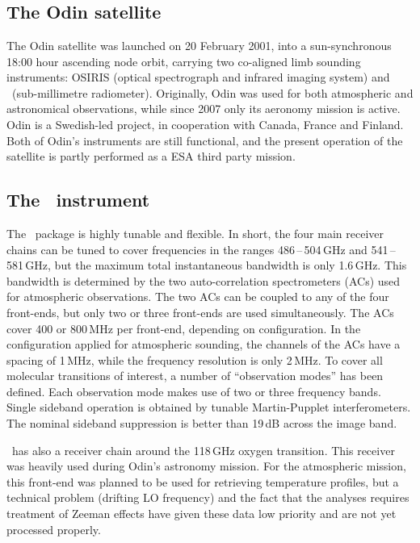 \section{\smr}
\label{sec:odin}
%
\subsection{The Odin satellite}
%
The Odin satellite was launched on 20 February 2001, into a sun-synchronous
18:00 hour ascending node orbit, carrying two co-aligned limb sounding
instruments: OSIRIS (optical spectrograph and infrared imaging system) and
\SMR\ (sub-millimetre radiometer). Originally, Odin was used for both
atmospheric and astronomical observations, while since 2007 only its aeronomy
mission is active. Odin is a Swedish-led project, in cooperation with Canada,
France and Finland. Both of Odin's instruments are still functional, and the
present operation of the satellite is partly performed as a ESA third party
mission.


\subsection{The \SMR\ instrument}
%
The \smr\ package is highly tunable and flexible. In short, the four main
receiver chains can be tuned to cover frequencies in the ranges
486\,--\,504\,GHz and 541\,-- \,581\,GHz, but the maximum total instantaneous
bandwidth is only 1.6\,GHz. This bandwidth is determined by the two
auto-correlation spectrometers (ACs) used for atmospheric observations. The two
ACs can be coupled to any of the four front-ends, but only two or three
front-ends are used simultaneously. The ACs cover 400 or 800\,MHz per
front-end, depending on configuration. In the configuration applied for
atmospheric sounding, the channels of the ACs have a spacing of 1\,MHz, while
the frequency resolution is only 2\,MHz. To cover all molecular transitions of
interest, a number of ``observation modes'' has been defined. Each observation
mode makes use of two or three frequency bands. Single sideband operation is
obtained by tunable Martin-Pupplet interferometers. The nominal sideband
suppression is better than 19\,dB across the image band.

\smr\ has also a receiver chain around the 118\,GHz oxygen transition. This
receiver was heavily used during Odin's astronomy mission. For the atmospheric
mission, this front-end was planned to be used for retrieving temperature
profiles, but a technical problem (drifting LO frequency) and the fact that the
analyses requires treatment of Zeeman effects have given these data low
priority and are not yet processed properly.

